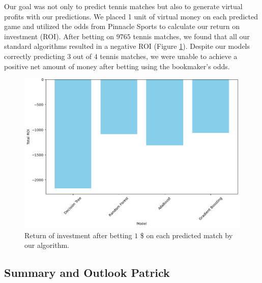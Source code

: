\documentclass[preprint,aps,nofootinbib,a4paper,superscriptaddress,longbibliography,amsfonts,amssymb,amsmath,titlepage]{revtex4-2}
\begin{document}
Our goal was not only to predict tennis matches but also to generate virtual profits with our predictions. We placed 1 unit of virtual money on each predicted game and utilized the odds from Pinnacle Sports to calculate our return on investment (ROI). After betting on $9765$ tennis matches, we found that all our standard algorithms resulted in a negative ROI (Figure \ref{betting-strategy}). Despite our models correctly predicting $3$ out of $4$ tennis matches, we were unable to achieve a positive net amount of money after betting using the bookmaker's odds.
%
\begin{figure}[h]
\includegraphics[width=\textwidth]{pictures/betting.png}
\caption{Return of investment after betting $1$ \$ on each predicted match by our algorithm.}
\label{betting-strategy}
\end{figure}
%

%
\subsection{Summary and Outlook Patrick}
\end{document}
